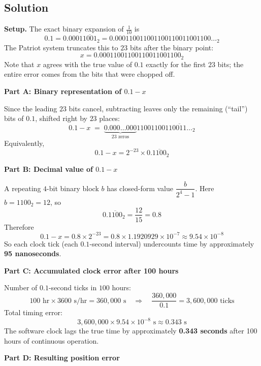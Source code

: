 \documentclass{article}
\begin{document}
\begin{flushleft}
    \section*{Solution}

    \noindent \textbf{Setup.}
    The exact binary expansion of $\frac{1}{10}$ is
    \[
        0.1 = 0.0001\overline{1001}_2 = 0.000110011001100110011001100\ldots_2
    \]
    The Patriot system truncates this to $23$ bits after the binary point:
    \[
        x = 0.00011001100110011001100_2
    \]
    Note that $x$ agrees with the true value of $0.1$ exactly for the first $23$ bits;
    the entire error comes from the bits that were chopped off.

    \bigskip
    \noindent \textbf{Part A: Binary representation of $0.1 - x$}

    \smallskip
    \noindent Since the leading $23$ bits cancel, subtracting leaves only the
    remaining (``tail'') bits of $0.1$, shifted right by $23$ places:
    \[
        0.1 - x \;=\; \underbrace{0.000\ldots000}_{23 \text{ zeros}}1100110011\overline{0011}\ldots_2
    \]
    Equivalently,
    \[
        0.1 - x = 2^{-23} \times 0.\overline{1100}_2
    \]

    \bigskip
    \noindent \textbf{Part B: Decimal value of $0.1 - x$}

    \smallskip
    \noindent A repeating $4$-bit binary block $b$ has closed-form value
    $\dfrac{b}{2^4 - 1}$. Here $b = 1100_2 = 12$, so
    \[
        0.\overline{1100}_2 = \frac{12}{15} = 0.8
    \]
    Therefore
    \[
        0.1 - x = 0.8 \times 2^{-23} = 0.8 \times 1.1920929\times 10^{-7}
        \approx 9.54 \times 10^{-8}
    \]
    So each clock tick (each $0.1$-second interval) undercounts time by
    approximately \textbf{95 nanoseconds}.

    \bigskip
    \noindent \textbf{Part C: Accumulated clock error after 100 hours}

    \smallskip
    \noindent Number of $0.1$-second ticks in $100$ hours:
    \[
        100 \text{ hr} \times 3600 \text{ s/hr} = 360{,}000 \text{ s}
        \quad\Longrightarrow\quad
        \frac{360{,}000}{0.1} = 3{,}600{,}000 \text{ ticks}
    \]
    Total timing error:
    \[
        3{,}600{,}000 \times 9.54\times 10^{-8}\text{ s} \approx 0.343 \text{ s}
    \]
    The software clock lags the true time by approximately
    \textbf{0.343 seconds} after 100 hours of continuous operation.

    \bigskip
    \noindent \textbf{Part D: Resulting position error}


\end{flushleft}
\end{document}
